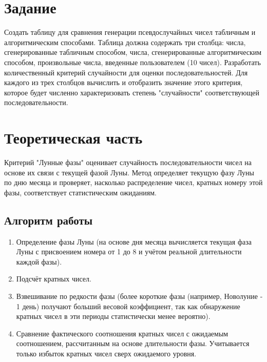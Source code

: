 \section*{Задание}

Создать таблицу для сравнения генерации псевдослучайных чисел табличным и алгоритмическим способами.
Таблица должна содержать три столбца: числа, сгенерированные табличным способом, числа, сгенерированные алгоритмическим способом, произвольные числа, введенные пользователем (10 чисел).
Разработать количественный критерий случайности для оценки последовательностей.
Для каждого из трех столбцов вычислить и отобразить значение этого критерия, которое будет численно характеризовать степень "случайности" соответствующей последовательности.

\newpage

\section*{Теоретическая часть}

Критерий "Лунные фазы" оценивает случайность последовательности чисел на основе их связи с текущей фазой Луны. Метод определяет текущую фазу Луны по дню месяца и проверяет, насколько распределение чисел, кратных номеру этой фазы, соответствует статистическим ожиданиям.

\subsection*{Алгоритм работы}

\begin{enumerate}
\item Определение фазы Луны (на основе дня месяца вычисляется текущая фаза Луны с присвоением номера от 1 до 8 и учётом реальной длительности каждой фазы).

\item Подсчёт кратных чисел.

\item Взвешивание по редкости фазы (более короткие фазы (например, Новолуние - 1 день) получают больший весовой коэффициент, так как обнаружение кратных чисел в эти периоды статистически менее вероятно).

\item Сравнение фактического соотношения кратных чисел с ожидаемым соотношением, рассчитанным на основе длительности фазы. Учитывается только избыток кратных чисел сверх ожидаемого уровня.

\end{enumerate}

